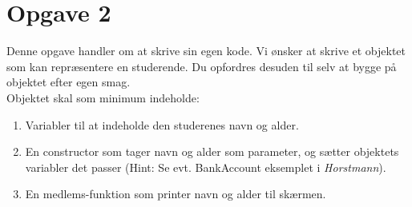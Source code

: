 \documentclass[a4paper]{article}
\begin{document}
\section{Opgave 2}

Denne opgave handler om at skrive sin egen kode. Vi ønsker at skrive et objektet som kan repræsentere en studerende. Du opfordres desuden til selv at bygge på objektet efter egen smag.\\

\noindent
Objektet skal som minimum indeholde:
\begin{enumerate}
\item Variabler til at indeholde den studerenes navn og alder.
\item En constructor som tager navn og alder som parameter, og sætter objektets variabler det passer (Hint: Se evt. BankAccount eksemplet i \textit{Horstmann}).
\item En medlems-funktion som printer navn og alder til skærmen.
\end{enumerate}
\end{document}
